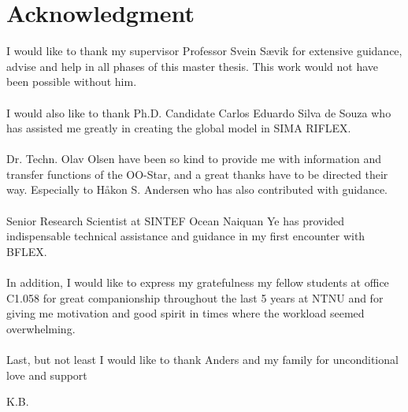 \chapter*{Acknowledgment}
I would like to thank my supervisor Professor Svein Sævik for extensive guidance, advise and help in all phases of this master thesis. This work would not have been possible without him. \\\\I would also like to thank Ph.D. Candidate Carlos Eduardo Silva de Souza who has assisted me greatly in creating the global model in SIMA RIFLEX. \\\\  Dr. Techn. Olav Olsen have been so kind to provide me with information and transfer functions of the OO-Star, and a great thanks have to be directed their way. Especially to Håkon S. Andersen who has also contributed with guidance. \\\\ Senior Research Scientist at SINTEF Ocean Naiquan Ye has provided indispensable technical assistance and guidance in my first encounter with BFLEX. \\\\ In addition, I would like to express my gratefulness my fellow students at office C1.058 for great companionship throughout the last 5 years at NTNU and for giving me motivation and good spirit in times where the workload seemed overwhelming. \\\\ Last, but not least I would like to thank Anders and my family for unconditional love and support


\newline
\newline
\newline

\begin{flushright}
K.B.
\end{flushright}

